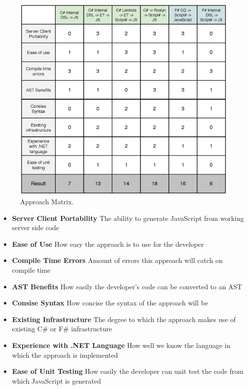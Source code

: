 	\begin{figure}
		\begin{center}
			\centerline{\includegraphics[width=16cm]{resources/images/approachmatrix.eps}}
		\end{center}
		\caption{Approach Matrix.}
		\label{approachMatrix}
	\end{figure}

	\begin{itemize}
		\item \textbf{Server Client Portability} The ability to generate JavaScript from working server side code
		\item \textbf{Ease of Use} How easy the approach is to use for the developer
		\item \textbf{Compile Time Errors} Amount of errors this approach will catch on compile time
		\item \textbf{AST Benefits} How easily the developer's code can be converted to an AST
		\item \textbf{Consise Syntax} How concise the syntax of the approach will be
		\item \textbf{Existing Infrastructure} The degree to which the approach makes use of existing C\# or F\# infrastructure
		\item \textbf{Experience with .NET Language} How well we know the language in which the approach is implemented
		\item \textbf{Ease of Unit Testing} How easily the developer can unit test the code from which JavaScript is generated
	\end{itemize}

